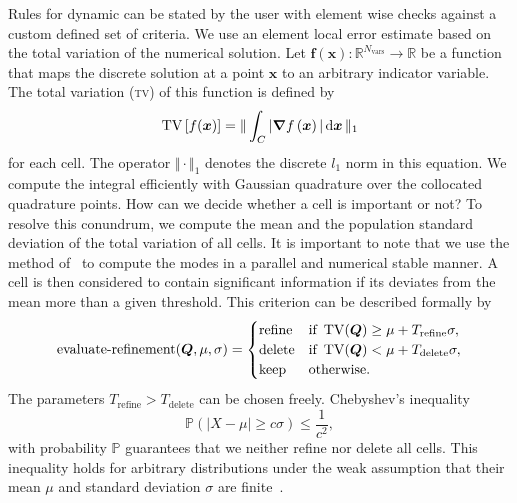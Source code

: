 \documentclass[runningheads]{llncs}
\begin{document}
Rules for dynamic \amr{} can be stated by the user with element wise checks against a custom defined set of criteria. We use an element local error estimate based on the total variation of the numerical solution. 
Let $\bm{f}(\bm{x}): \mathbb{R}^{N_\text{vars}} \to \mathbb{R}$ be a function that maps the discrete solution at a point $\bm{x}$ to an arbitrary indicator variable.
The total variation (\textsc{tv}) of this function is defined by
\begin{equation}
  \label{eq:tv}
  \tv \left[ f(\bm{x}) \right] =
  \Vert
\intdcell{ \vert \gradient{f \left( \bm{x} \right)} \vert }
\Vert_1
\end{equation}
for each cell.
The operator $\Vert \cdot \Vert_1$ denotes the discrete $l_1$ norm in this equation.
We compute the integral efficiently with Gaussian quadrature over the collocated quadrature points.
\newcommand{\mean}{\mu}%
\newcommand{\std}{\sigma}%
\newcommand{\variance}{\std^2}%
\newcommand{\Trefine}{T_\text{refine}}%
\newcommand{\Tdelete}{T_\text{delete}}%
How can we decide whether a cell is important or not?
To resolve this conundrum, we compute the mean and the population standard deviation of the total variation of all cells.
It is important to note that we use the method of~\cite{chan1982updating} to compute the modes in a parallel and numerical stable manner.
A cell is then considered to contain significant information if its deviates from the mean more than a given threshold.
This criterion can be described formally by
\begin{equation}
  \label{eq:refinement-criterion}
  \operatorname{evaluate-refinement}(\Q, \mu, \sigma) =
  \begin{cases}
    \text{refine} & \text{if } \tv(\Q) \geq \mu + \Trefine \sigma, \\
    \text{delete} & \text{if } \tv(\Q) < \mu + \Tdelete \sigma, \\
    \text{keep} & \text{otherwise}.
    \end{cases}
\end{equation}
The parameters $\Trefine > \Tdelete$ can be chosen freely.
Chebyshev's inequality
\begin{equation}
  \label{eq:chebychev}
  \mathbb{P}(\vert X - \mu \vert \geq c \sigma) \leq \frac{1}{c^2},
\end{equation}
with probability $\mathbb{P}$ guarantees that we neither refine nor delete all cells. 
This inequality holds for arbitrary distributions under the weak assumption that their mean $\mu$ and standard deviation $\sigma$ are finite~\cite{wasserman2004all}.
\end{document}
